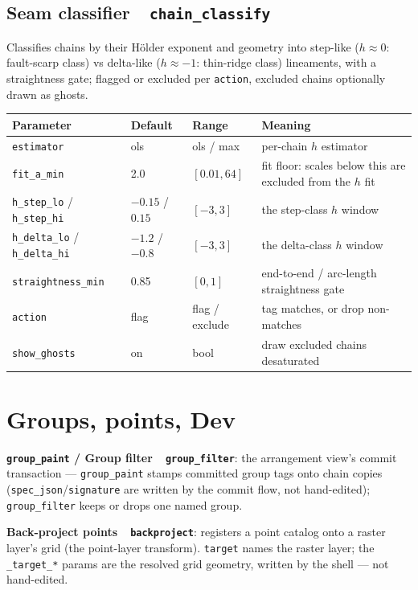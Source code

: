 \documentclass[10pt]{article}
\newcommand{\dev}[1]{\texttt{#1}}
\newcommand{\tool}[2]{#1~\textperiodcentered~\dev{#2}}
\begin{document}
\subsection{\tool{Seam classifier}{chain\_classify}}
Classifies chains by their H\"older exponent and geometry into step-like
($h\approx 0$: fault-scarp class) vs delta-like ($h\approx -1$: thin-ridge class)
lineaments, with a straightness gate; flagged or excluded per \texttt{action}, excluded
chains optionally drawn as ghosts.

\begin{longtable}{L l l M}
\toprule Parameter & Default & Range & Meaning \\ \midrule
\texttt{estimator} & ols & ols / max & per-chain $h$ estimator \\
\texttt{fit\_a\_min} & 2.0 & $[0.01,64]$ & fit floor: scales below this are excluded from the $h$ fit \\
\texttt{h\_step\_lo} / \texttt{h\_step\_hi} & $-0.15$ / $0.15$ & $[-3,3]$ & the step-class $h$ window \\
\texttt{h\_delta\_lo} / \texttt{h\_delta\_hi} & $-1.2$ / $-0.8$ & $[-3,3]$ & the delta-class $h$ window \\
\texttt{straightness\_min} & 0.85 & $[0,1]$ & end-to-end / arc-length straightness gate \\
\texttt{action} & flag & flag / exclude & tag matches, or drop non-matches \\
\texttt{show\_ghosts} & on & bool & draw excluded chains desaturated \\
\bottomrule
\end{longtable}

\section{Groups, points, Dev}

\textbf{\dev{group\_paint} / \tool{Group filter}{group\_filter}}: the arrangement view's commit
transaction --- \dev{group\_paint} stamps committed group tags onto chain copies
(\texttt{spec\_json}/\texttt{signature} are written by the commit flow, not hand-edited);
\dev{group\_filter} keeps or drops one named group.

\textbf{\tool{Back-project points}{backproject}}: registers a point catalog onto a raster layer's grid
(the point-layer transform). \texttt{target} names the raster layer; the
\texttt{\_target\_*} params are the resolved grid geometry, written by the shell ---
not hand-edited.
\end{document}
